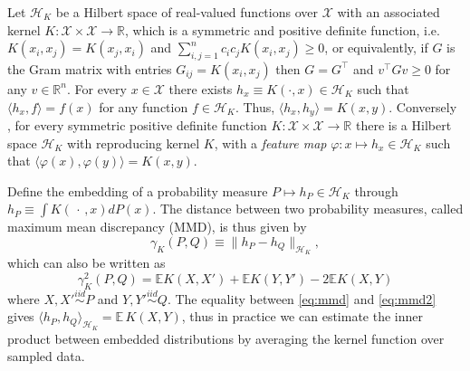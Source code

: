 \documentclass[twoside]{article}
\newcommand\E{\mathbb{E}}
\newcommand\kk{K}
\newcommand\kkk{h}
\newcommand\Hk{{\mathcal{H}}_{\kk}}
\newcommand\HH{\mathcal{H}}
\begin{document}
Let $\HH_\kk$ be a Hilbert space of real-valued functions
over $\mathcal{X}$ with an associated kernel
$\kk : \mathcal{X} \times \mathcal{X} \to 
\mathbb{R}$, which is a symmetric and positive definite function, i.e. 
$\kk(x_i,x_j) = \kk(x_j,x_i)$ and 
$\sum_{i,j=1}^n c_i c_j \kk(x_i, x_j) \ge 0$, or equivalently,
if $G$ is the Gram matrix with entries $G_{ij} = \kk(x_i,x_j)$
then $G = G^\top$ and $v^\top G v \ge 0$ for any $v \in \mathbb{R}^n$.
For every $x \in \mathcal{X}$ there exists 
$h_x \equiv \kk(\cdot,x) \in \Hk$ such that  $\langle h_x, f \rangle = f(x)$
for any function $f \in \Hk$. Thus, 
$\langle h_x, h_y \rangle = \kk(x,y)$.
Conversely \citep{Aronszajn},  
for every symmetric
positive definite function $\kk: \mathcal{X}\times \mathcal{X} \to
\mathbb{R}$ there is a Hilbert space $\Hk$ with reproducing
kernel $\kk$, with a 
\emph{feature map} $\varphi: x \mapsto \kkk_x \in \Hk$ such
that $\langle \varphi(x), \varphi(y) \rangle = \kk(x, y)$.

Define the embedding of a probability measure
$P \mapsto \kkk_P \in \Hk$ through
$\kkk_P \equiv \int \kk( \, \cdot \,, x)  d P(x)$. 
The distance between two probability measures, 
called maximum mean discrepancy (MMD), is thus given by
\begin{equation}
\label{eq:mmd}
\gamma_\kk(P,Q) \equiv \| \kkk_P - \kkk_Q \|_{\Hk},
\end{equation}
which can also be written as \citep{Gretton2012}
\begin{equation}\label{eq:mmd2}
\gamma_\kk^2(P,Q) = \E \kk(X,X') + \E \kk(Y,Y') - 2 \E \kk(X, Y)
\end{equation}
where $X,X' \stackrel{iid}{\sim} P$ and $Y,Y'\stackrel{iid}{\sim} Q$.
The equality between \eqref{eq:mmd} and \eqref{eq:mmd2}
gives $\langle \kkk_P, \kkk_Q \rangle_{\Hk} = \E \, \kk(X, Y)$,
thus in practice we can estimate the inner product between  
embedded distributions by averaging the kernel function over sampled data.
\end{document}
